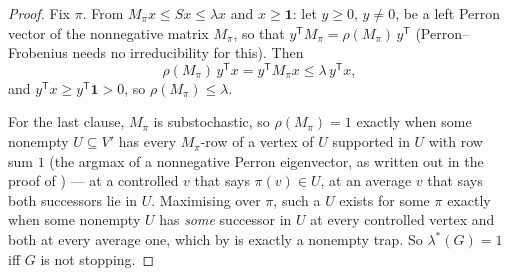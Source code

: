 \documentclass[11pt]{article}
\theoremstyle{plain}
\theoremstyle{definition}
\newcommand{\bbone}{\mathbf{1}}
\begin{document}
\begin{proof}
Fix $\pi$. From $M_\pi x\le Sx\le\lambda x$ and $x\ge\bbone$: let
$y\ge0$, $y\ne0$, be a left Perron vector of the nonnegative matrix
$M_\pi$, so that $y^{\mathsf T}M_\pi=\rho(M_\pi)\,y^{\mathsf T}$
(Perron--Frobenius needs no irreducibility for this). Then
\[
  \rho(M_\pi)\,y^{\mathsf T}x=y^{\mathsf T}M_\pi x\le\lambda\,y^{\mathsf T}x,
\]
and $y^{\mathsf T}x\ge y^{\mathsf T}\bbone>0$, so $\rho(M_\pi)\le\lambda$.

For the last clause, $M_\pi$ is substochastic, so $\rho(M_\pi)=1$ exactly
when some nonempty $U\subseteq V'$ has every $M_\pi$-row of a vertex of
$U$ supported in $U$ with row sum $1$ (the argmax of a nonnegative Perron
eigenvector, as written out in the proof of ) --- at a controlled $v$ that says
$\pi(v)\in U$, at an average $v$ that says both successors lie in $U$.
Maximising over $\pi$, such a $U$ exists for some $\pi$ exactly when some
nonempty $U$ has \emph{some} successor in $U$ at every controlled vertex
and both at every average one, which by  is exactly a
nonempty trap. So $\lambda^{\ast}(G)=1$ iff $G$ is not stopping.
\end{proof}
\end{document}
